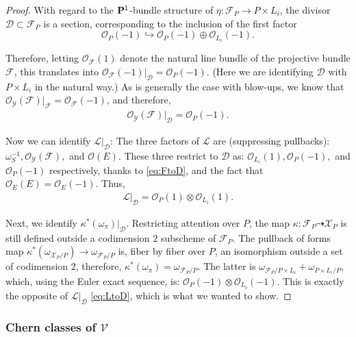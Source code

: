 \documentclass[12pt,reqno]{amsart}
\renewcommand{\to}{{\longrightarrow}}
\numberwithin{equation}{section}
\renewcommand{\O}{\mathcal O}
\newcommand{\V}{\mathcal V}
\begin{document}
\begin{proof}
  With regard to the $\P^{1}$-bundle structure of
  $\eta: \mathcal{F}_{P} \to P \times L_{i}$, the divisor
  $\mathcal{D} \subset \mathcal{F}_{P}$ is a section, corresponding to
  the inclusion of the first factor
  \[\O_{P}(-1) \hookrightarrow \O_{P}(-1) \oplus \O_{L_{i}}(-1). \]

  Therefore, letting $\O_{\mathcal{F}}(1)$ denote the natural line
  bundle of the projective bundle $\mathcal{F}$, this translates into
  $\O_{\mathcal{F}}(-1)|_{\mathcal{D}} = \O_{P}(-1)$. (Here we are
  identifying $\mathcal{D}$ with $P \times L_{i}$ in the natural way.)
  As is generally the case with blow-ups, we know that
  $\O_{\mathcal{Y}}(\mathcal{F})\big|_{\mathcal{F}} =
  \O_{\mathcal{F}}(-1)$, and therefore,
  \begin{align}\label{eq:FtoD}
    \O_{\mathcal{Y}}(\mathcal{F}) \big|_{\mathcal{D}} = \O_{P}(-1).
  \end{align}

  Now we can identify $\mathcal{L}|_{\mathcal{D}}$: The three factors
  of $\mathcal{L}$ are (suppressing pullbacks):
  $\omega_{S}^{-1}, \O_{\mathcal{Y}}(\mathcal{F}),$ and $\O(E)$. These
  three restrict to $\mathcal{D}$ as: $\O_{L_{i}}(1), \O_{P}(-1),$ and
  $ \O_{P}(-1)$ respectively, thanks to \eqref{eq:FtoD}, and the fact
  that $\O_{E}(E) = \O_{E}(-1)$.  Thus,
  \begin{align}
    \label{eq:LtoD}
    \mathcal{L}|_{\mathcal{D}} = \O_{P}(1) \otimes \O_{L_{i}}(1).
  \end{align}

  Next, we identify $\kappa^{*}(\omega_{\pi})|_{\mathcal{D}}$.
  Restricting attention over $P$, the map
  $\kappa: \mathcal{F}_{P} \dashrightarrow \mathcal{X}_{P}$ is still
  defined outside a codimension $2$ subscheme of $\mathcal{F}_{P}$.
  The pullback of forms map
  $\kappa^{*}(\omega_{\mathcal{X}_{P}/P}) \to
  \omega_{\mathcal{F}_{P}/P}$ is, fiber by fiber over $P$, an
  isomorphism outside a set of codimension $2$, therefore,
  $\kappa^* \left( \omega_{\pi} \right) = \omega_{\mathcal{F}_{P}/P}.$
  The latter is
  $\omega_{\mathcal{F}_{P}/P \times L_{i}} + \omega_{P \times
    L_{i}/P}$, which, using the Euler exact sequence, is:
  $\O_{P}(-1) \otimes \O_{L_{i}}(-1)$.  This is exactly the opposite
  of $\mathcal{L}\big|_{\mathcal{D}}$ \eqref{eq:LtoD}, which is what we wanted to
  show.

  
\end{proof} 


\subsubsection{Chern classes of $\V$}
\label{sec:chern-classes-v4}
\end{document}
